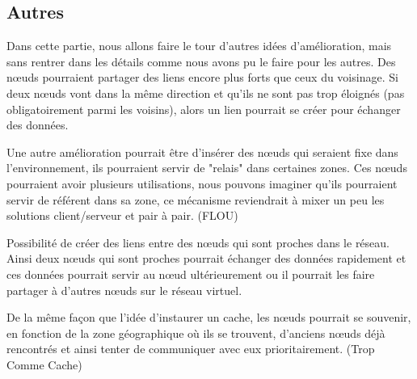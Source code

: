 \newpage
\subsection{Autres}
Dans cette partie, nous allons faire le tour d'autres idées d'amélioration, mais sans rentrer dans les détails comme nous avons pu le faire pour les autres. Des nœuds pourraient partager des liens encore plus forts que ceux du voisinage. Si deux nœuds vont dans la même direction et qu'ils ne sont pas trop éloignés (pas obligatoirement parmi les voisins), alors un lien pourrait se créer pour échanger des données.

\par Une autre amélioration pourrait être d'insérer des nœuds qui seraient fixe dans l'environnement, ils pourraient servir de "relais" dans certaines zones. Ces nœuds pourraient avoir plusieurs utilisations, nous pouvons imaginer qu'ils pourraient servir de référent dans sa zone, ce mécanisme reviendrait à mixer un peu les solutions client/serveur et pair à pair. (FLOU)

\par Possibilité de créer des liens entre des nœuds qui sont proches dans le réseau. Ainsi deux nœuds qui sont proches pourrait échanger des données rapidement et ces données pourrait servir au nœud ultérieurement ou il pourrait les faire partager à d'autres nœuds sur le réseau virtuel. 
 
\par De la même façon que l'idée d'instaurer un cache, les nœuds pourrait se souvenir, en fonction de la zone géographique où ils se trouvent, d'anciens nœuds déjà rencontrés et ainsi tenter de communiquer avec eux prioritairement. (Trop Comme Cache)



